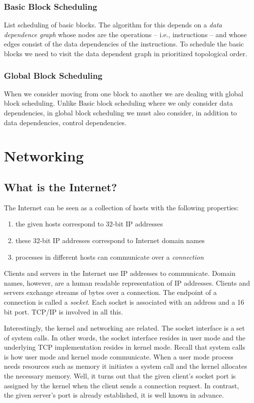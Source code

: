 \documentclass{amsbook}
\begin{document}
\subsection{Basic Block Scheduling}
List scheduling of basic blocks. The algorithm for this depends on a \textit{data dependence graph} whose nodes are the operations -- i.e., instructions -- and whose edges consist of the data dependencies of the instructions. To schedule the basic blocks we need to visit the data dependent graph in prioritized topological order.

\subsection{Global Block Scheduling}
When we consider moving from one block to another we are dealing with global block scheduling. Unlike Basic block scheduling where we only consider data dependencies, in global block scheduling we must also consider, in addition to data dependencies, control dependencies.

\chapter{Networking}
\section{What is the Internet?}
The Internet can be seen as a collection of hosts with the following properties:
\begin{enumerate}
    \item the given hosts correspond to 32-bit IP addresses
    \item these 32-bit IP addresses correspond to Internet domain names
    \item processes in different hosts can communicate over a \textit{connection}
\end{enumerate}

Clients and servers in the Internet use IP addresses to communicate. Domain names, however, are a human readable representation of IP addresses. Clients and servers exchange streams of bytes over a connection. The endpoint of a connection is called a \textit{socket}. Each socket is associated with an address and a 16 bit port. TCP/IP is involved in all this.

Interestingly, the kernel and networking are related. The socket interface is a set of system calls. In other words, the socket interface resides in user mode and the underlying TCP implementation resides in kernel mode. Recall that system calls is how user mode and kernel mode communicate. When a user mode process needs resources such as memory it initiates a system call and the kernel allocates the necessary memory. Well, it turns out that the given client's socket port is assigned by the kernel when the client sends a connection request. In contrast, the given server's port is already established, it is well known in advance. 
\end{document}
